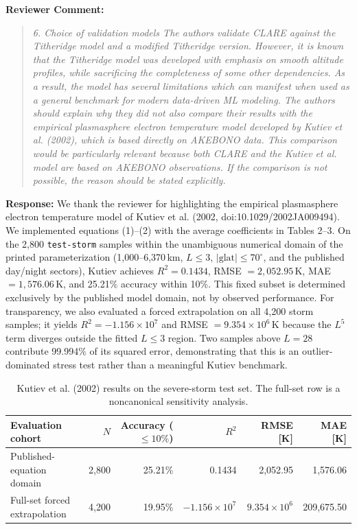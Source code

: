 \documentclass[a4paper,12pt]{article}
\newcommand{\reviewercomment}[1]{%
  \begin{samepage}%
  \par\noindent\textbf{Reviewer Comment:}\par
  \begin{quote}\itshape #1\end{quote}}
\newcommand{\filledresponse}[1]{%
  \par\noindent\textbf{Response:} #1\par
  \vspace{0.4cm}%
  \end{samepage}}
\begin{document}
\reviewercomment{6. Choice of validation models The authors validate CLARE against the Titheridge model and a
modified Titheridge version. However, it is known that the Titheridge model was developed with
emphasis on smooth altitude profiles, while sacrificing the completeness of some other dependencies.
As a result, the model has several limitations which can manifest when used as a general benchmark
for modern data-driven ML modeling. The authors should explain why they did not also compare their
results with the empirical plasmasphere electron temperature model developed by Kutiev et al.
(2002), which is based directly on AKEBONO data. This comparison would be particularly relevant
because both CLARE and the Kutiev et al. model are based on AKEBONO observations. If the comparison
is not possible, the reason should be stated explicitly.}
\filledresponse{We thank the reviewer for highlighting the empirical plasmasphere electron temperature model of Kutiev et al. (2002, doi:10.1029/2002JA009494). We implemented equations (1)--(2) with the average coefficients in Tables 2--3. On the 2,800 \texttt{test-storm} samples within the unambiguous numerical domain of the printed parameterization (1,000--6,370\,km, $L\leq3$, $|\mathrm{glat}|\leq70^\circ$, and the published day/night sectors), Kutiev achieves $R^2=0.1434$, RMSE $=2,052.95$\,K, MAE $=1,576.06$\,K, and 25.21\% accuracy within 10\%. This fixed subset is determined exclusively by the published model domain, not by observed performance. For transparency, we also evaluated a forced extrapolation on all 4,200 storm samples; it yields $R^2=-1.156\times10^7$ and RMSE $=9.354\times10^6$\,K because the $L^5$ term diverges outside the fitted $L\leq3$ region. Two samples above $L=28$ contribute 99.994\% of its squared error, demonstrating that this is an outlier-dominated stress test rather than a meaningful Kutiev benchmark.}

\begin{table}[htbp]
    \centering
    \caption{Kutiev et al. (2002) results on the severe-storm test set. The full-set row is a noncanonical sensitivity analysis.}
    \begin{tabular}{lrrrrr}
        \toprule
        Evaluation cohort & $N$ & Accuracy ($\leq10\%$) & $R^2$ & RMSE [K] & MAE [K] \\
        \midrule
        Published-equation domain & 2,800 & 25.21\% & 0.1434 & 2,052.95 & 1,576.06 \\
        Full-set forced extrapolation & 4,200 & 19.95\% & $-1.156\times10^7$ & $9.354\times10^6$ & 209,675.50 \\
        \bottomrule
    \end{tabular}
    \label{tab:kutiev_storm_domains}
\end{table}
\end{document}
